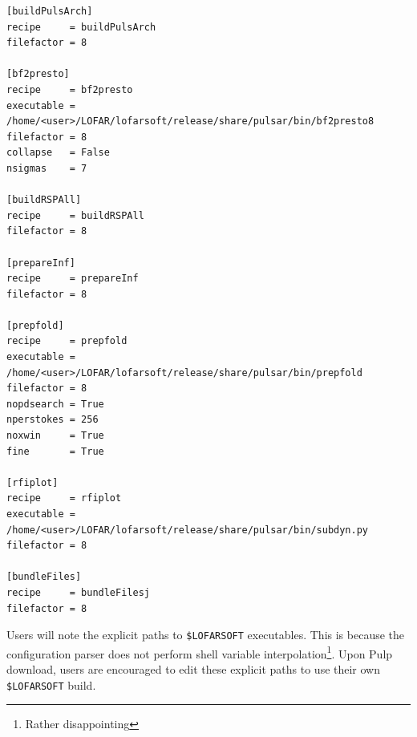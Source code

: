 \documentclass[a4paper,10pt,bibtotoc]{scrartcl}
\begin{document}
\begin{verbatim}
[buildPulsArch]
recipe     = buildPulsArch
filefactor = 8

[bf2presto]
recipe     = bf2presto
executable = /home/<user>/LOFAR/lofarsoft/release/share/pulsar/bin/bf2presto8
filefactor = 8
collapse   = False
nsigmas    = 7

[buildRSPAll]
recipe     = buildRSPAll
filefactor = 8

[prepareInf]
recipe     = prepareInf
filefactor = 8

[prepfold]
recipe     = prepfold
executable = /home/<user>/LOFAR/lofarsoft/release/share/pulsar/bin/prepfold
filefactor = 8
nopdsearch = True
nperstokes = 256
noxwin     = True
fine       = True

[rfiplot]
recipe     = rfiplot
executable = /home/<user>/LOFAR/lofarsoft/release/share/pulsar/bin/subdyn.py
filefactor = 8

[bundleFiles]
recipe     = bundleFilesj
filefactor = 8
\end{verbatim}
Users will note the explicit paths to \verb|$LOFARSOFT| executables.
This is because the configuration parser does not perform shell variable
interpolation\footnote{Rather disappointing}.  Upon Pulp download, users are encouraged to edit these explicit paths to use their own \verb|$LOFARSOFT| build.
\
\end{document}
